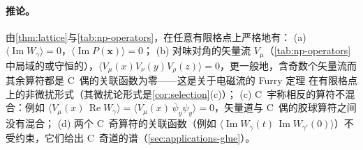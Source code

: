 \documentclass[UTF8,a4paper,11pt,fontset=fandol]{ctexart}
\theoremstyle{cplain}
\theoremstyle{cdefinition}
\theoremstyle{cremark}
\numberwithin{equation}{section}
\DeclareMathOperator{\Real}{Re}
\DeclareMathOperator{\Imag}{Im}
\begin{document}
\paragraph{推论。}由\cref{thm:lattice}与\cref{tab:np-operators}，在任意有限格点上严格地有：
(a) $\langle\Imag W_\gamma\rangle=0$，$\langle\Imag P(\boldsymbol x)\rangle=0$；
(b) 对味对角的矢量流 $V_\mu$（\cref{tab:np-operators}中局域的或守恒的），$\langle V_\mu(x)V_\nu(y)V_\rho(z)\rangle=0$，更一般地，含奇数个矢量流而其余算符都是 C~偶的关联函数为零——这是关于电磁流的 Furry 定理
在有限格点上的非微扰形式（其微扰论形式是\cref{cor:selection}(c)）；
(c) C~宇称相反的算符不混合：例如 $\langle V_\mu(x)\,\Real W_\gamma\rangle=\langle V_\mu(x)\,\bar\psi_y\psi_y\rangle=0$，矢量道与 C~偶的胶球算符之间没有混合；
(d) 两个 C~奇算符的关联函数（例如 $\langle\Imag W_\gamma(t)\,\Imag W_{\gamma'}(0)\rangle$）不受约束，它们给出 C~奇道的谱（\cref{sec:applications-glue}）。
\end{document}
